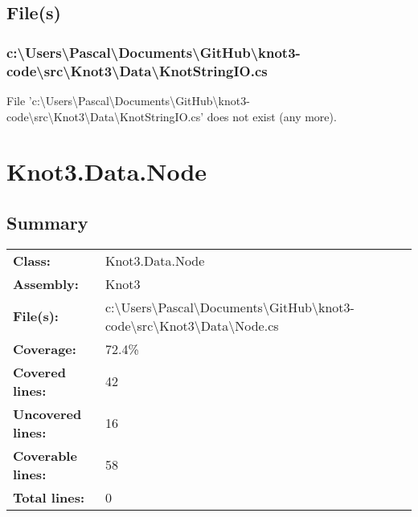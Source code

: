 \documentclass[a4paper,10pt]{article}
\begin{document}
\subsection{File(s)}
\subsubsection{c:\textbackslash Users\textbackslash Pascal\textbackslash Documents\textbackslash GitHub\textbackslash knot3-code\textbackslash src\textbackslash Knot3\textbackslash Data\textbackslash KnotStringIO.cs}
 File 'c:\textbackslash Users\textbackslash Pascal\textbackslash Documents\textbackslash GitHub\textbackslash knot3-code\textbackslash src\textbackslash Knot3\textbackslash Data\textbackslash KnotStringIO.cs' does not exist (any more).
\newpage
\section{Knot3.Data.Node}
\subsection{Summary}
\begin{longtable}[l]{ll}
\textbf{Class:} & Knot3.Data.Node\\
\textbf{Assembly:} & Knot3\\
\textbf{File(s):} & \begin{minipage}[t]{12cm}{c:\textbackslash Users\textbackslash Pascal\textbackslash Documents\textbackslash GitHub\textbackslash knot3-code\textbackslash src\textbackslash Knot3\textbackslash Data\textbackslash Node.cs}\end{minipage} \\
\textbf{Coverage:} & 72.4\%\\
\textbf{Covered lines:} & 42\\
\textbf{Uncovered lines:} & 16\\
\textbf{Coverable lines:} & 58\\
\textbf{Total lines:} & 0\\
\end{longtable}
\end{document}
